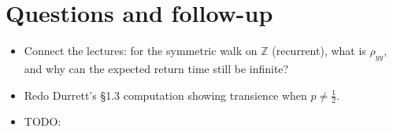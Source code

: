 \documentclass[11pt]{article}
\newcommand{\1}{\mathbf{1}}
\theoremstyle{notestyle}
\theoremstyle{definition}
\begin{document}
\section{Questions and follow-up}
\begin{itemize}
  \item Connect the lectures: for the symmetric walk on $\mathbb{Z}$ (recurrent),
    what is $\rho_{yy}$, and why can the expected return time still be infinite?
  \item Redo Durrett's \S1.3 computation showing transience when $p \neq
    \frac{1}{2}$.
  \item TODO:
\end{itemize}
\end{document}
